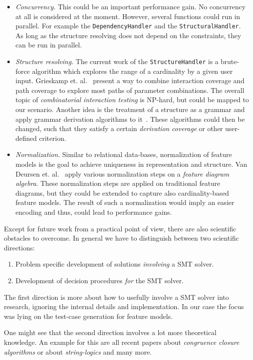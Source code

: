 \begin{itemize}
 \item \emph{Concurrency.} This could be an important performance gain. No concurrency at all is considered at the moment. However, several functions could run in parallel. For example the \texttt{DependencyHandler} and the \texttt{StructuralHandler}. As long as the structure resolving does not depend on the constraints, they can be run in parallel.
 
 \item \emph{Structure resolving.} The current work of the \texttt{StructureHandler} is a brute-force algorithm which explores the range of a cardinality by a given user input. Grieskamp et. al.~\cite{path-interaction-coverage} present a way to combine interaction coverage and path coverage to explore most paths of parameter combinations. The overall topic of \emph{combinatorial interaction testing} is NP-hard, but could be mapped to our scenario. Another idea is the treatment of a structure as a grammar and apply grammar derivation algorithms to it~\cite{fm-grammar-prop, grammar-based-tc-generation-fm}. These algorithms could then be changed, such that they satisfy a certain \emph{derivation coverage} or other user-defined criterion.
 
 \item \emph{Normalization.} Similar to relational data-bases, normalization of feature models is the goal to achieve uniqueness in representation and structure. Van Deursen et. al.~\cite{fm-normalization} apply various normalization steps on a \emph{feature diagram algebra}. These normalization steps are applied on traditional feature diagrams, but they could be extended to capture also cardinality-based feature models. The result of such a normalization would imply an easier encoding and thus, could lead to performance gains.
\end{itemize}

Except for future work from a practical point of view, there are also scientific obstacles to overcome. 
In general we have to distinguish between two scientific directions:
\begin{enumerate}
 \item Problem specific development of solutions \emph{involving} a SMT solver.
 
 \item Development of decision procedures \emph{for} the SMT solver.
\end{enumerate}

The first direction is more about how to usefully involve a SMT solver into research, ignoring the internal details and implementation. In our case the focus was lying on the test-case generation for feature models.

One might see that the second direction involves a lot more theoretical knowledge. An example for this are all recent papers about \emph{congruence closure algorithms} or about \emph{string-logics} and many more.

